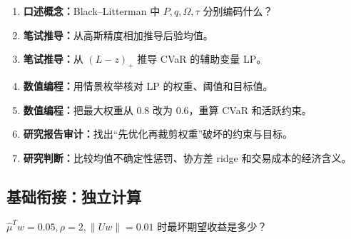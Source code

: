 \begin{enumerate}[leftmargin=*]
  \item \textbf{口述概念：}Black--Litterman 中 $P,q,\Omega,\tau$ 分别编码什么？
  \item \textbf{笔试推导：}从高斯精度相加推导后验均值。
  \item \textbf{笔试推导：}从 $(L-z)_+$ 推导 CVaR 的辅助变量 LP。
  \item \textbf{数值编程：}用情景枚举核对 LP 的权重、阈值和目标值。
  \item \textbf{数值编程：}把最大权重从 0.8 改为 0.6，重算 CVaR 和活跃约束。
  \item \textbf{研究报告审计：}找出“先优化再裁剪权重”破坏的约束与目标。
  \item \textbf{研究判断：}比较均值不确定性惩罚、协方差 ridge 和交易成本的经济含义。
\end{enumerate}


\MFQMappedPortfolioOptimizationQuestions

\subsection*{基础衔接：独立计算}
$\hat\mu^Tw=0.05,\rho=2,\|Uw\|=0.01$ 时最坏期望收益是多少？
